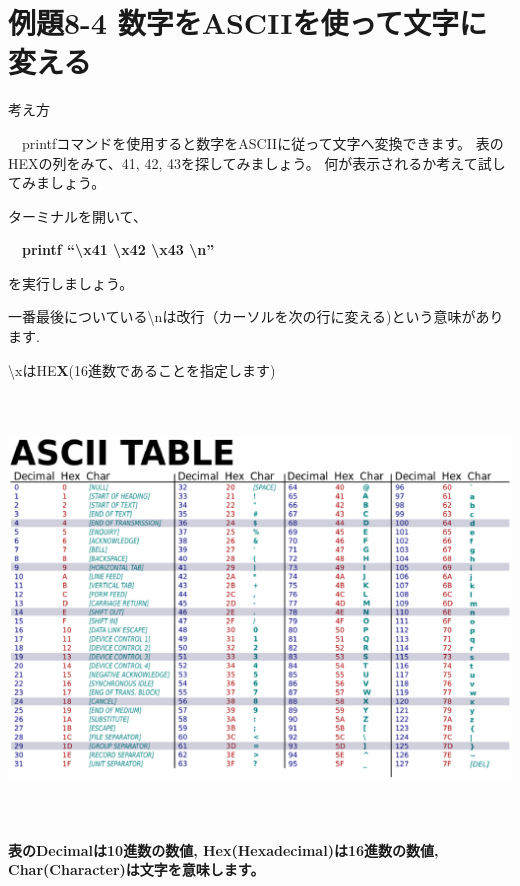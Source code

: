 \documentclass[a4paper,12pt,dvipdfmx]{jarticle}
\begin{document}
\bigskip

\clearpage\section{例題8-4
数字をASCIIを使って文字に変える}
考え方

\ \ printfコマンドを使用すると数字をASCIIに従って文字へ変換できます。
表のHEXの列をみて、41,
42,
43を探してみましょう。
何が表示されるか考えて試してみましょう。

ターミナルを開いて、

\ \ \textbf{printf “{\textbackslash}x41 {\textbackslash}x42 {\textbackslash}x43 {\textbackslash}n”}

を実行しましょう。

一番最後についている{\textbackslash}nは改行（カーソルを次の行に変える)という意味があります.

{\textbackslash}xはHE\textbf{X}(16進数であることを指定します)

\begin{center}
\includegraphics[width=17.006cm,height=11.317cm]{textbook-img016.eps}

\end{center}

\bigskip


\bigskip

{\bfseries
表のDecimalは10進数の数値,
Hex(Hexadecimal)は16進数の数値,
Char(Character)は文字を意味します。}
\end{document}
